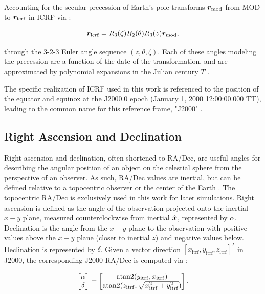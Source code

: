 Accounting for the secular precession of Earth's pole transforms $\bm{r}_\mathrm{mod}$ from MOD to $\bm{r}_\mathrm{icrf}$ in ICRF via \cite{vallado4ed}:

\begin{equation} \label{eq:mod_to_icrf}
  \bm{r}_\mathrm{icrf} = R_3(\zeta) R_2(\theta) R_3(z) \bm{r}_\mathrm{mod},
\end{equation}

through the 3-2-3 Euler angle sequence $\left( z, \theta, \zeta \right)$. Each of these angles modeling the precession are a function of the date of the transformation, and are approximated by polynomial expansions in the Julian century $T$ \cite{frueh2019notes}.

The specific realization of ICRF used in this work is referenced to the position of the equator and equinox at the J2000.0 epoch (January 1, 2000 12:00:00.000 TT), leading to the common name for this reference frame, "J2000" \cite{vallado4ed}.

\subsection{Right Ascension and Declination}

Right ascension and declination, often shortened to RA/Dec, are useful angles for describing the angular position of an object on the celestial sphere from the perspective of an observer. As such, RA/Dec values are inertial, but can be defined relative to a topocentric observer or the center of the Earth \cite{frueh2019notes}. The topocentric RA/Dec is exclusively used in this work for later simulations. Right ascension is defined as the angle
of the observation projected onto the inertial $x-y$ plane, measured counterclockwise from inertial
$\hat{\bm{x}}$, represented by $\alpha$. Declination is the angle from the $x-y$ plane to the observation
with positive values above the $x-y$ plane (closer to inertial $z$) and negative values below.
Declination is represented by $\delta$. Given a vector direction $\left[ x_\mathrm{itrf}, y_\mathrm{itrf}, z_\mathrm{itrf} \right]^T$ in J2000, the corresponding J2000 RA/Dec is computed via \cite{frueh2019notes}:

\begin{equation} \label{eq:eci_to_ra_dec}
  \begin{bmatrix}
	\alpha \\
	\delta
  \end{bmatrix} = 
  \begin{bmatrix}
	\operatorname{atan2}(y_\mathrm{itrf}, x_\mathrm{itrf}) \\
	\operatorname{atan2}(z_\mathrm{itrf}, \sqrt{x_\mathrm{itrf}^2 + y_\mathrm{itrf}^2})
  \end{bmatrix}.
\end{equation}

